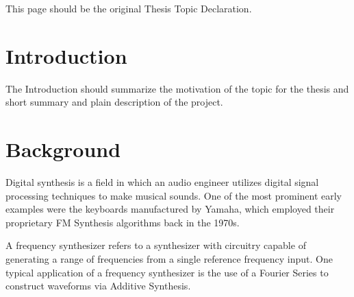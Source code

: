 \documentclass[a4paper,12pt]{report}
\begin{document}




\vspace*{\fill}
\begin{center}
This page should be the original Thesis Topic Declaration.
\end{center}
\vfill
\thispagestyle{empty}
\newpage
\setcounter{page}{1}


\tableofcontents



\chapter{Introduction}

The Introduction should summarize the motivation of the topic for the thesis and short summary and plain description of the project.



\chapter{Background}
Digital synthesis is a field in which an audio engineer utilizes digital signal processing techniques to make musical sounds. One of the most prominent early examples were the keyboards manufactured by Yamaha, which employed their proprietary FM Synthesis algorithms back in the 1970s.

A frequency synthesizer refers to a synthesizer with circuitry capable of generating a range of frequencies from a single reference frequency input. One typical application of a frequency synthesizer is the use of a Fourier Series to construct waveforms via Additive Synthesis.
\end{document}

